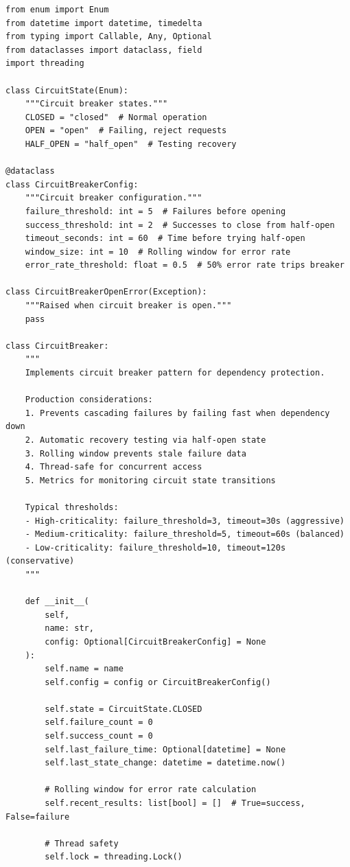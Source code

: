 \begin{lstlisting}[style=python, caption={Circuit Breaker Pattern}]
from enum import Enum
from datetime import datetime, timedelta
from typing import Callable, Any, Optional
from dataclasses import dataclass, field
import threading

class CircuitState(Enum):
    """Circuit breaker states."""
    CLOSED = "closed"  # Normal operation
    OPEN = "open"  # Failing, reject requests
    HALF_OPEN = "half_open"  # Testing recovery

@dataclass
class CircuitBreakerConfig:
    """Circuit breaker configuration."""
    failure_threshold: int = 5  # Failures before opening
    success_threshold: int = 2  # Successes to close from half-open
    timeout_seconds: int = 60  # Time before trying half-open
    window_size: int = 10  # Rolling window for error rate
    error_rate_threshold: float = 0.5  # 50% error rate trips breaker

class CircuitBreakerOpenError(Exception):
    """Raised when circuit breaker is open."""
    pass

class CircuitBreaker:
    """
    Implements circuit breaker pattern for dependency protection.

    Production considerations:
    1. Prevents cascading failures by failing fast when dependency down
    2. Automatic recovery testing via half-open state
    3. Rolling window prevents stale failure data
    4. Thread-safe for concurrent access
    5. Metrics for monitoring circuit state transitions

    Typical thresholds:
    - High-criticality: failure_threshold=3, timeout=30s (aggressive)
    - Medium-criticality: failure_threshold=5, timeout=60s (balanced)
    - Low-criticality: failure_threshold=10, timeout=120s (conservative)
    """

    def __init__(
        self,
        name: str,
        config: Optional[CircuitBreakerConfig] = None
    ):
        self.name = name
        self.config = config or CircuitBreakerConfig()

        self.state = CircuitState.CLOSED
        self.failure_count = 0
        self.success_count = 0
        self.last_failure_time: Optional[datetime] = None
        self.last_state_change: datetime = datetime.now()

        # Rolling window for error rate calculation
        self.recent_results: list[bool] = []  # True=success, False=failure

        # Thread safety
        self.lock = threading.Lock()


\end{lstlisting}

